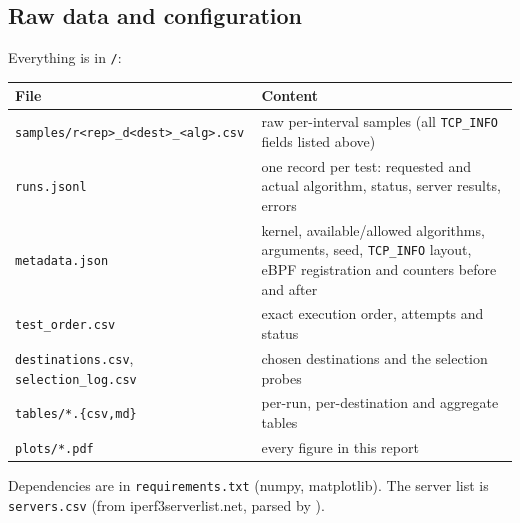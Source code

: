\documentclass[11pt]{article}
\begin{document}
\subsection{Raw data and configuration}
Everything is in \texttt{\rundir/}:
\begin{center}\small
\begin{tabular}{>{\raggedright\arraybackslash}p{5.4cm}>{\raggedright\arraybackslash}p{10.0cm}}
\toprule
File & Content \\
\midrule
\texttt{samples/}\allowbreak\texttt{r<rep>\_d<dest>\_<alg>.csv} & raw per-interval samples (all \texttt{TCP\_INFO} fields listed above) \\
\texttt{runs.jsonl} & one record per test: requested and actual algorithm, status, server results, errors \\
\texttt{metadata.json} & kernel, available/allowed algorithms, arguments, seed, \texttt{TCP\_INFO} layout, eBPF registration and counters before and after \\
\texttt{test\_order.csv} & exact execution order, attempts and status \\
\texttt{destinations.csv}, \texttt{selection\_log.csv} & chosen destinations and the selection probes \\
\texttt{tables/*.\{csv,md\}} & per-run, per-destination and aggregate tables \\
\texttt{plots/*.pdf} & every figure in this report \\
\bottomrule
\end{tabular}
\end{center}
Dependencies are in \texttt{requirements.txt} (numpy, matplotlib). The server list is \texttt{servers.csv}
(from iperf3serverlist.net, parsed by ).
\end{document}
